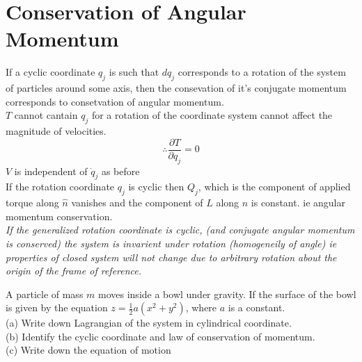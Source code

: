 \section{Conservation of Angular Momentum}
If a cyclic coordinate $q_j$ is such that $dq_j$ corresponds to a rotation of the system of particles around some axis, then the consevation of it's conjugate momentum corresponds to consetvation of angular momentum.\\
$T$ cannot cantain $q_j$ for a rotation of the coordinate system cannot affect the magnitude of velocities.
$$\therefore \frac{\partial T}{\partial q_j}=0$$
$V$ is independent of $\dot{q}_j$ as before\\
If the rotation coordinate $q_j$ is cyclic then $Q_j$, which is the component of applied torque along $\hat{n}$ vanishes and the component of $L$ along $n$ is constant. ie angular momentum conservation.\\
\textit{If the generalized rotation coordinate is cyclic, (and conjugate angular momentum is conserved) the system is invarient under rotation (homogeneily of angle) ie properties of closed system will not change due to arbitrary rotation about the origin of the frame of reference.}
\begin{exercise}
	 A particle of mass $m$ moves inside a bowl under gravity. If the surface of the bowl is given by the equation $z=\frac{1}{2} a\left(x^{2}+y^{2}\right)$, where $a$ is a constant.\\
	(a) Write down Lagrangian of the system in cylindrical coordinate.\\
	(b) Identify the cyclic coordinate and law of conservation of momentum.\\
	(c) Write down the equation of motion
\end{exercise}	

